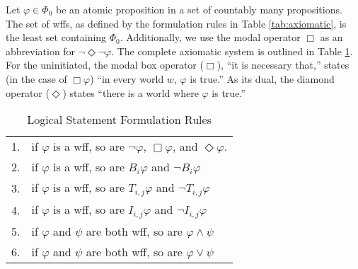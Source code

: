 Let $\varphi \in \Phi_0$ be an atomic proposition in a set of countably many propositions.
The set of \acp{wff}, as defined by the formulation rules in Table \ref{tab:axiomatic}, is the least set containing $\Phi_0$.
Additionally, we use the modal operator $\Box$ as an abbreviation for $\neg \Diamond \neg \varphi$.
The complete axiomatic system is outlined in Table \ref{tab:wffs}.
For the uninitiated, the modal box operator ($\Box$), ``it is necessary that,'' states (in the case of $\Box \varphi$) ``in every world $w$, $\varphi$ is true.'' As its dual, the diamond operator ($\Diamond$) states ``there is a world where $\varphi$ is true.''

\begin{table}[]
\small
\centering
\caption{Logical Statement Formulation Rules}
\begin{tabular}{r l}
1. & if $\varphi$ is a wff, so are $\neg \varphi$, $\Box \varphi$, and $\Diamond \varphi$. \\
2. & if $\varphi$ is a wff, so are $B_i \varphi$ and $\neg B_i \varphi$ \\
3. & if $\varphi$ is a wff, so are $T_{i,j} \varphi$ and $\neg T_{i,j} \varphi$ \\
4. & if $\varphi$ is a wff, so are $I_{i,j} \varphi$ and $\neg I_{i,j} \varphi$ \\
5. & if $\varphi$ and $\psi$ are both wff, so are $\varphi \wedge \psi$ \\
6. & if $\varphi$ and $\psi$ are both wff, so are $\varphi \vee \psi$ \\
\end{tabular}
\label{tab:wffs}
\end{table}

